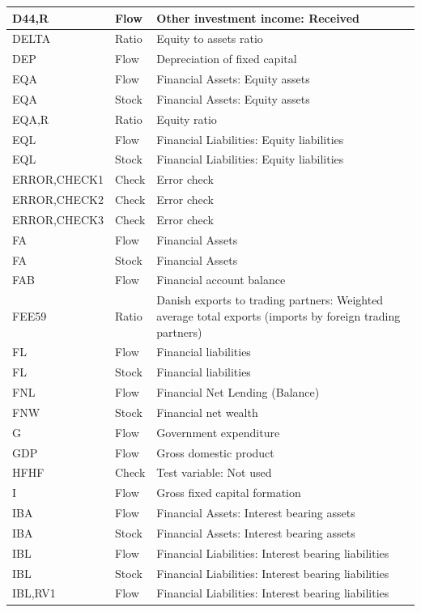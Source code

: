 \documentclass[
]{book}
\begin{document}
\begin{tabular}[t]{l|l|l}
\hline
D44,R & Flow & Other investment income: Received\\
\hline
DELTA & Ratio & Equity to assets ratio\\
\hline
DEP & Flow & Depreciation of fixed capital\\
\hline
EQA & Flow & Financial Assets: Equity assets\\
\hline
EQA & Stock & Financial Assets: Equity assets\\
\hline
EQA,R & Ratio & Equity ratio\\
\hline
EQL & Flow & Financial Liabilities: Equity liabilities\\
\hline
EQL & Stock & Financial Liabilities: Equity liabilities\\
\hline
ERROR,CHECK1 & Check & Error check\\
\hline
ERROR,CHECK2 & Check & Error check\\
\hline
ERROR,CHECK3 & Check & Error check\\
\hline
FA & Flow & Financial Assets\\
\hline
FA & Stock & Financial Assets\\
\hline
FAB & Flow & Financial account balance\\
\hline
FEE59 & Ratio & Danish exports to trading partners: Weighted average total exports (imports by foreign trading partners)\\
\hline
FL & Flow & Financial liabilities\\
\hline
FL & Stock & Financial liabilities\\
\hline
FNL & Flow & Financial Net Lending (Balance)\\
\hline
FNW & Stock & Financial net wealth\\
\hline
G & Flow & Government expenditure\\
\hline
GDP & Flow & Gross domestic product\\
\hline
HFHF & Check & Test variable: Not used\\
\hline
I & Flow & Gross fixed capital formation\\
\hline
IBA & Flow & Financial Assets: Interest bearing assets\\
\hline
IBA & Stock & Financial Assets: Interest bearing assets\\
\hline
IBL & Flow & Financial Liabilities: Interest bearing liabilities\\
\hline
IBL & Stock & Financial Liabilities: Interest bearing liabilities\\
\hline
IBL,RV1 & Flow & Financial Liabilities: Interest bearing liabilities\\

\end{tabular}
\end{document}
